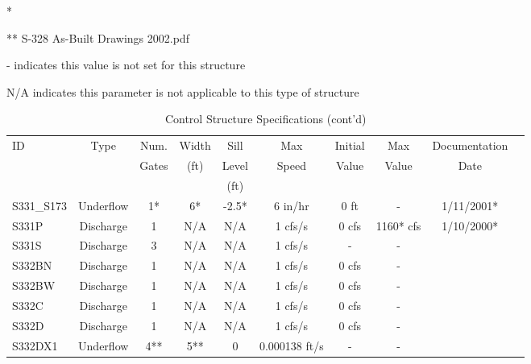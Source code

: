 \begin{table}[h]
* \cite{corp2005}

** S-328 As-Built Drawings 2002.pdf

- indicates this value is not set for this structure

N/A indicates this parameter is not applicable to this type of structure
\end{table}
\normalsize

\scriptsize
\begin{table}[h]
\caption{Control Structure Specifications (cont'd)}
\label{tab:struc-specs3}
\begin{tabular}{@{}lccccccccc@{}}
\toprule
{ID}            & {Type}        & Num.     & Width       & Sill         & Max            & Initial         & Max        & Documentation  \\
                &               & Gates    & (ft)        & Level        & Speed          & Value           & Value      & Date           \\
                &               &          &             & (ft)         &                &                 &            &                \\
\hline
{S331\_S173}    & Underflow     & 1*       & 6*          & -2.5*        & 6 in/hr        & 0 ft            & -          & 1/11/2001*  \\
{S331P}         & Discharge     & 1        & N/A         & N/A          & 1 cfs/s        & 0 cfs           & 1160* cfs  & 1/10/2000*  \\
{S331S}         & Discharge     & 3        & N/A         & N/A          & 1 cfs/s        & -               & -          &             \\
{S332BN}        & Discharge     & 1        & N/A         & N/A          & 1 cfs/s        & 0 cfs           & -          &             \\
{S332BW}        & Discharge     & 1        & N/A         & N/A          & 1 cfs/s        & 0 cfs           & -          &             \\
{S332C}         & Discharge     & 1        & N/A         & N/A          & 1 cfs/s        & 0 cfs           & -          &             \\
{S332D}         & Discharge     & 1        & N/A         & N/A          & 1 cfs/s        & 0 cfs           & -          &             \\
{S332DX1}       & Underflow     & 4**      & 5**         & 0            & 0.000138 ft/s  & -               & -          &             \\

\end{tabular}
\end{table}

